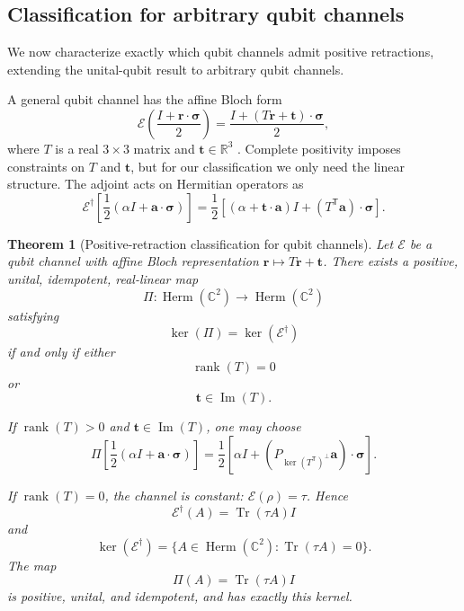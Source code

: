 \documentclass[
aps,pra,twocolumn,10pt,
superscriptaddress,longbibliography,floatfix
]{revtex4-2}
\DeclareMathOperator{\Tr}{Tr}
\DeclareMathOperator{\rank}{rank}
\DeclareMathOperator{\Herm}{Herm}
\DeclareMathOperator{\im}{Im}
\newtheorem{theorem}{Theorem}[section]
\begin{document}
\subsection{Classification for arbitrary qubit channels}

We now characterize exactly which qubit channels admit positive retractions, extending the unital-qubit result to arbitrary qubit channels.

A general qubit channel has the affine Bloch form
\begin{equation}
\mathcal E\!\left(\frac{I+\mathbf r\cdot\boldsymbol\sigma}{2}\right)
=
\frac{I+(T\mathbf r+\mathbf t)\cdot\boldsymbol\sigma}{2},
\label{eq:qubit_bloch}
\end{equation}
where $T$ is a real $3\times3$ matrix and $\mathbf t\in\mathbb R^3$ \cite{FujiwaraAlgoet1999,Ruskai2002}. Complete positivity imposes constraints on $T$ and $\mathbf t$, but for our classification we only need the linear structure. The adjoint acts on Hermitian operators as
\[
\mathcal E^\dagger\!\left[\frac12(\alpha I+\mathbf a\cdot\boldsymbol\sigma)\right]
=
\frac12\left[(\alpha+\mathbf t\cdot\mathbf a)I+(T^{\mathsf T}\mathbf a)\cdot\boldsymbol\sigma\right].
\]

\begin{theorem}[Positive-retraction classification for qubit channels]
\label{thm:all_qubit_retraction}
Let $\mathcal E$ be a qubit channel with affine Bloch representation $\mathbf r\mapsto T\mathbf r+\mathbf t$. There exists a positive, unital, idempotent, real-linear map
\[
\Pi:\Herm(\mathbb C^2)\longrightarrow\Herm(\mathbb C^2)
\]
satisfying
\[
\ker(\Pi)=\ker(\mathcal E^\dagger)
\]
if and only if either
\[
\rank(T)=0
\]
or
\[
\mathbf t\in\im(T).
\]

If $\rank(T)>0$ and $\mathbf t\in\im(T)$, one may choose
\[
\Pi\!\left[
\frac12(\alpha I+\mathbf a\cdot\boldsymbol\sigma)
\right]
=
\frac12
\left[
\alpha I+
(P_{\ker(T^{\mathsf T})^\perp}\mathbf a)
\cdot\boldsymbol\sigma
\right].
\]

If $\rank(T)=0$, the channel is constant: $\mathcal E(\rho)=\tau$. Hence
\[
\mathcal E^\dagger(A)=\Tr(\tau A)I
\]
and
\[
\ker(\mathcal E^\dagger)
=
\{A\in\Herm(\mathbb C^2):\Tr(\tau A)=0\}.
\]
The map
\[
\Pi(A)=\Tr(\tau A)I
\]
is positive, unital, and idempotent, and has exactly this kernel.
\end{theorem}
\end{document}
